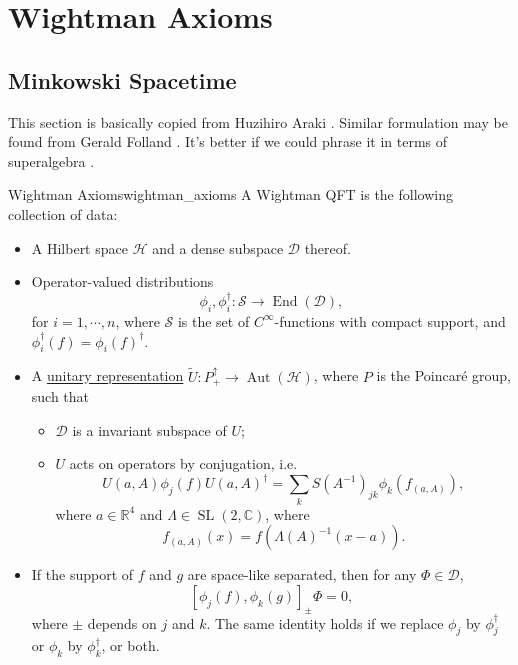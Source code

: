 \documentclass{article}
\begin{document}
\section{Wightman Axioms}

\subsection{Minkowski Spacetime}

This section is basically copied from Huzihiro Araki \cite{Araki_Huzihiro2009-07-05}.
Similar formulation may be found from Gerald Folland \cite{Gerald_B_Folland2008-08-26}.
It's better if we could phrase it in terms of superalgebra \cite{Pierre_Deligne1999-06}.

\begin{definition}{Wightman Axioms}{wightman_axioms}
    A Wightman QFT is the following collection of data: \cite{Araki_Huzihiro2009-07-05}
    \begin{itemize}
        \item A Hilbert space $\mathcal{H}$ and a dense subspace $\mathcal{D}$ thereof.
        \item Operator-valued distributions
        \[ \phi_i, \phi_i^\dagger: \mathcal{S} \rightarrow \operatorname{End}(\mathcal{D}), \]
        for $i = 1,\cdots, n$, where $\mathcal{S}$ is the set of $C^\infty$-functions with compact support, and $\phi_i^\dagger(f) = \phi_i(f)^\dagger$.
        \item A \hyperref[Repr-def:unitary_representation]{unitary representation} $\tilde{U}: P^{\uparrow}_+\rightarrow \operatorname{Aut}(\mathcal{H})$, where $P$ is the Poincar\'e group, such that
        \begin{itemize}
            \item $\mathcal{D}$ is a invariant subspace of $U$;
            \item $U$ acts on operators by conjugation, i.e.
            \[ U(a, A) \phi_j(f) U(a, A)^\dagger = \sum_k S(A^{-1})_{jk} \phi_k(f_{(a, A)}), \]
            where $a\in \mathbb{R}^4$ and $\Lambda\in \operatorname{SL}(2,\mathbb{C})$, where
            \[ f_{(a,A)}(x) = f(\Lambda(A)^{-1}(x-a)). \]
        \end{itemize}
        \item If the support of $f$ and $g$ are space-like separated, then for any $\Phi \in \mathcal{D}$,
        \[ [\phi_j(f), \phi_k(g)]_\pm \Phi = 0, \]
        where $\pm$ depends on $j$ and $k$. The same identity holds if we replace $\phi_j$ by $\phi_j^\dagger$ or $\phi_k$ by $\phi_k^\dagger$, or both.

\end{itemize}
\end{definition}
\end{document}
